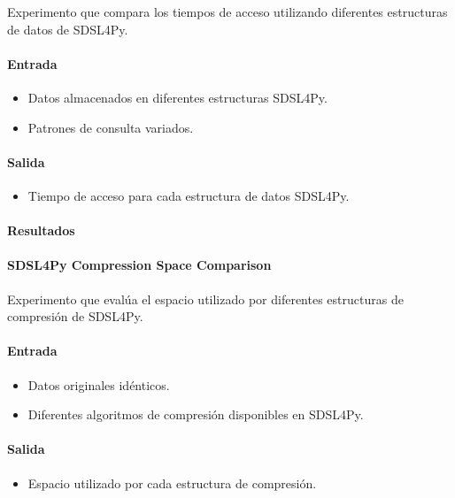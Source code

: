 Experimento que compara los tiempos de acceso utilizando diferentes estructuras de datos de SDSL4Py.

\paragraph{Entrada}
\begin{itemize}
    \item Datos almacenados en diferentes estructuras SDSL4Py.
    \item Patrones de consulta variados.
\end{itemize}

\paragraph{Salida}
\begin{itemize}
    \item Tiempo de acceso para cada estructura de datos SDSL4Py.
\end{itemize}

\paragraph{Resultados}
\vspace{0.5em}
\noindent

\SDSLFourPyAccessTimeComparison
\newpage

\paragraph{SDSL4Py Compression Space Comparison}
\label{sdsl4py_compression_space}

Experimento que evalúa el espacio utilizado por diferentes estructuras de compresión de SDSL4Py.

\paragraph{Entrada}
\begin{itemize}
    \item Datos originales idénticos.
    \item Diferentes algoritmos de compresión disponibles en SDSL4Py.
\end{itemize}

\paragraph{Salida}
\begin{itemize}
    \item Espacio utilizado por cada estructura de compresión.
\end{itemize}

